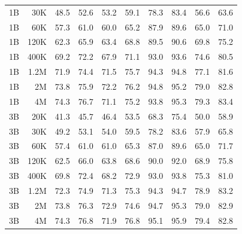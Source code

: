 \begin{table}[t]
\begin{tabulary}{1.0\textwidth}{l r c c c c c c c c}
1B    & 30K   & 48.5 & 52.6 & 53.2 & 59.1 & 78.3 & 83.4 & 56.6 & 63.6 \\
1B    & 60K   & 57.3 & 61.0 & 60.0 & 65.2 & 87.9 & 89.6 & 65.0 & 71.0 \\
1B    & 120K  & 62.3 & 65.9 & 63.4 & 68.8 & 89.5 & 90.6 & 69.8 & 75.2 \\
1B    & 400K  & 69.2 & 72.2 & 67.9 & 71.1 & 93.0 & 93.6 & 74.6 & 80.5 \\
1B    & 1.2M    & 71.9 & 74.4 & 71.5 & 75.7 & 94.3 & 94.8 & 77.1 & 81.6 \\
1B    & 2M    & 73.8 & 75.9 & 72.2 & 76.2 & 94.8 & 95.2 & 79.0 & 82.8 \\
1B    & 4M    & 74.3 & 76.7 & 71.1 & 75.2 & 93.8 & 95.3 & 79.3 & 83.4 \\
\midrule[0.25pt]
3B    & 20K   & 41.3 & 45.7 & 46.4 & 53.5 & 68.3 & 75.4 & 50.0 & 58.9 \\
3B    & 30K   & 49.2 & 53.1 & 54.0 & 59.5 & 78.2 & 83.6 & 57.9 & 65.8 \\
3B    & 60K   & 57.4 & 61.0 & 61.0 & 65.3 & 87.0 & 89.6 & 65.0 & 71.7 \\
3B    & 120K  & 62.5 & 66.0 & 63.8 & 68.6 & 90.0 & 92.0 & 68.9 & 75.8 \\
3B    & 400K  & 69.8 & 72.4 & 68.2 & 72.9 & 93.0 & 93.8 & 75.3 & 81.0 \\
3B    & 1.2M    & 72.3 & 74.9 & 71.3 & 75.3 & 94.3 & 94.7 & 78.9 & 83.2 \\
3B    & 2M    & 73.8 & 76.3 & 72.9 & 74.6 & 94.7 & 95.3 & 79.0 & 82.9 \\
3B    & 4M    & 74.3 & 76.8 & 71.9 & 76.8 & 95.1 & 95.9 & 79.4 & 82.8 \\
    \bottomrule
  \end{tabulary}
\end{table}


